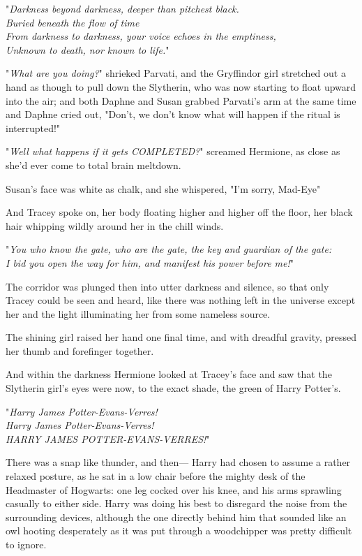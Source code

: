 "\emph{Darkness beyond darkness, deeper than pitchest black.\\
Buried beneath the flow of time{\el}\\
From darkness to darkness, your voice echoes in the emptiness,\\
Unknown to death, nor known to life.}"

"\emph{What are you doing?}" shrieked Parvati, and the Gryffindor girl
stretched out a hand as though to pull down the Slytherin, who was now starting
to float upward into the air; and both Daphne and Susan grabbed Parvati's arm
at the same time and Daphne cried out, "Don't, we don't know what will happen
if the ritual is interrupted!"

"\emph{Well what happens if it gets COMPLETED?}" screamed Hermione, as close as
she'd ever come to total brain meltdown.

Susan's face was white as chalk, and she whispered, "I'm sorry, Mad-Eye{\el}"

And Tracey spoke on, her body floating higher and higher off the floor, her
black hair whipping wildly around her in the chill winds.

"\emph{You who know the gate, who are the gate, the key and guardian of the
gate:\\
I bid you open the way for him, and manifest his power before me!}"

The corridor was plunged then into utter darkness and silence, so that only
Tracey could be seen and heard, like there was nothing left in the universe
except her and the light illuminating her from some nameless source.

The shining girl raised her hand one final time, and with dreadful gravity,
pressed her thumb and forefinger together.

And within the darkness Hermione looked at Tracey's face and saw that the
Slytherin girl's eyes were now, to the exact shade, the green of Harry Potter's.

"\emph{Harry James Potter-Evans-Verres!\\
Harry James Potter-Evans-Verres!\\
HARRY JAMES POTTER-EVANS-VERRES!}"

There was a snap like thunder, and then—
\sbreak
Harry had chosen to assume a rather relaxed posture, as he sat in a low chair
before the mighty desk of the Headmaster of Hogwarts: one leg cocked over his
knee, and his arms sprawling casually to either side. Harry was doing his best
to disregard the noise from the surrounding devices, although the one directly
behind him that sounded like an owl hooting desperately as it was put through a
woodchipper was pretty difficult to ignore.


